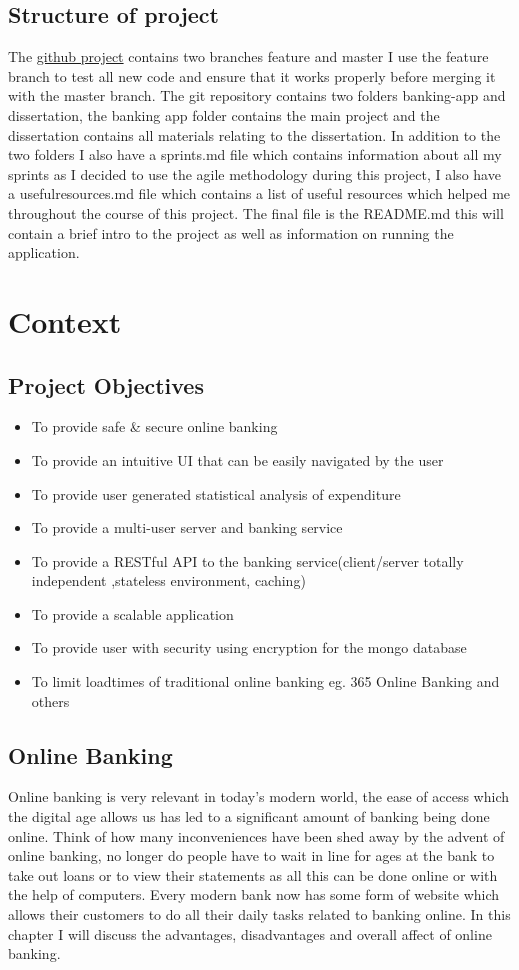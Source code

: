 \section{Structure of project}
The \href{https://github.com/Ultan-Kearns/AppliedProject}{github project} contains two branches feature and master
I use the feature branch to test all new code and ensure that it works properly before merging it with the master
branch.  The git repository contains two folders banking-app and dissertation, the banking app folder contains the
main project and the dissertation contains all materials relating to the dissertation. In addition to the two folders
I also have a sprints.md file which contains information about all my sprints as I decided to use the agile methodology during this project, I also have a usefulresources.md file which contains a list of useful resources which helped me throughout the course of this project.  The final file is the README.md this will contain a brief intro to the project as well as information on running the application.
\chapter{Context}
\section{Project Objectives}
\begin{itemize}
  \item To provide safe \& secure online banking
  \item To provide an intuitive UI that can be easily navigated by the user
  \item To provide user generated statistical analysis of expenditure
  \item To provide a multi-user server and banking service
  \item To provide a RESTful API to the banking service(client/server totally independent
  ,stateless environment, caching)
  \item To provide a scalable application
  \item To provide user with security using encryption for the mongo database
  \item To limit loadtimes of traditional online banking eg. 365 Online Banking and others
\end{itemize}
\section{Online Banking}
Online banking is very relevant in today's modern world, the ease of access which
the digital age allows us has led to a significant amount of banking being done
online.  Think of how many inconveniences have been shed away by the advent of online
banking, no longer do people have to wait in line for ages at the bank to take out loans
or to view their statements as all this can be done online or with the help of computers.
Every modern bank now has some form of website which allows their customers to do
all their daily tasks related to banking online.  In this chapter I will discuss the
advantages, disadvantages and overall affect of online banking.
